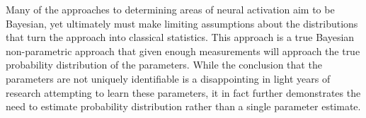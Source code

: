 Many of the approaches to determining areas of neural activation aim
to be Bayesian, yet ultimately must make limiting assumptions about
the distributions that turn the approach into classical statistics. 
This approach is a true Bayesian non-parametric approach that given
enough measurements will approach the true probability distribution
of the parameters. While the conclusion that the parameters are not
uniquely identifiable is a disappointing in light years of research 
attempting to learn these parameters, it in fact further demonstrates
the need to estimate probability distribution rather than a single 
parameter estimate.

